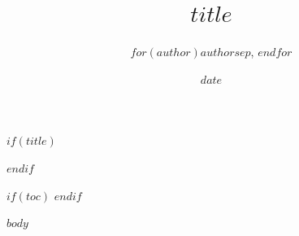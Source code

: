 \documentclass{article}
\title{$title$}
\author{$for(author)$$author$$sep$, $endfor$}
\date{$date$}
\begin{document}
$if(title)$
  \maketitle
$endif$

$if(toc)$
  {
    \hypersetup{linkcolor=black}
    \tableofcontents
  }
$endif$

$body$
\end{document}
